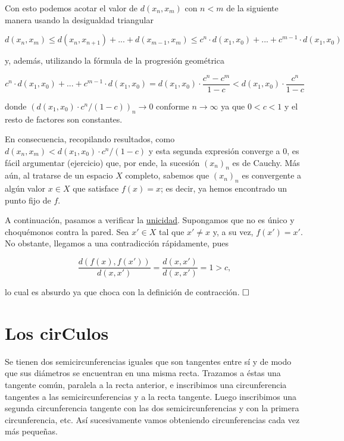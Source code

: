 \documentclass{article}
\begin{document}
Con esto podemos acotar el valor de $d(x_n, x_m)$ con $n < m$ de la siguiente manera usando la desigualdad triangular

\[d(x_n, x_m) \leq d(x_n, x_{n+1}) + ... + d(x_{m-1}, x_m) \leq c^n \cdot d(x_1, x_0) + ... + c^{m-1} \cdot d(x_1, x_0)\]

\noindent y, además, utilizando la fórmula de la progresión geométrica

\[c^n \cdot d(x_1, x_0) + ... + c^{m-1} \cdot d(x_1, x_0) = d(x_1, x_0) \cdot \frac{c^n - c^m}{1 - c} < d(x_1, x_0) \cdot \frac{c^n}{1 - c}\]

\noindent donde $(d(x_1, x_0) \cdot c^n/(1 - c))_n \to 0$ conforme $n \to \infty$ ya que $0 < c < 1$ y el resto de factores son constantes. 

En consecuencia, recopilando resultados, como $d(x_n, x_m) < d(x_1, x_0) \cdot c^n/(1 - c)$ y esta segunda expresión converge a 0, es fácil argumentar (ejercicio) que, por ende, la sucesión $(x_n)_n$ es de Cauchy. Más aún, al tratarse de un espacio $X$ completo, sabemos que $(x_n)_n$ es convergente a algún valor $x \in X$ que satisface $f(x) = x$; es decir, ya hemos encontrado un punto fijo de $f$.

A continuación, pasamos a verificar la \underline{unicidad}. Supongamos que no es único y choquémonos contra la pared. Sea $x' \in X$ tal que $x' \neq x$ y, a su vez, $f(x') = x'$. No obstante, llegamos a una contradicción rápidamente, pues

\[\frac{d(f(x), f(x'))}{d(x, x')} = \frac{d(x, x')}{d(x, x')} = 1 > c,\]

\noindent lo cual es absurdo ya que choca con la definición de contracción. $\hfill\square$

\newpage

\section{Los cirCulos}

Se tienen dos semicircunferencias iguales que son tangentes entre sí y de modo que sus diámetros se encuentran en una misma recta. Trazamos a éstas una tangente común, paralela a la recta anterior, e inscribimos una circunferencia tangentes a las semicircunferencias y a la recta tangente. Luego inscribimos una segunda circunferencia tangente con las dos semicircunferencias y con la primera circunferencia, etc. Así sucesivamente vamos obteniendo circunferencias cada vez más pequeñas. \\
\end{document}
